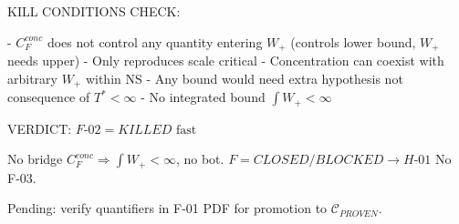 \documentclass[11pt]{article}
\begin{document}
KILL CONDITIONS CHECK:

- $C_F^{conc}$ does not control any quantity entering $W_+$ (controls lower bound, $W_+$ needs upper)
- Only reproduces scale critical
- Concentration can coexist with arbitrary $W_+$ within NS
- Any bound would need extra hypothesis not consequence of $T^*<\infty$
- No integrated bound $\int W_+<\infty$

VERDICT: $\boxed{F\text{-}02=KILLED\text{ fast}}$

No bridge $C_F^{conc}\Rightarrow\int W_+<\infty$, no bot. $\boxed{F=CLOSED/BLOCKED\rightarrow H\text{-}01}$ No F-03.

Pending: verify quantifiers in F-01 PDF for promotion to $\mathcal C_{PROVEN}$.
\end{document}
